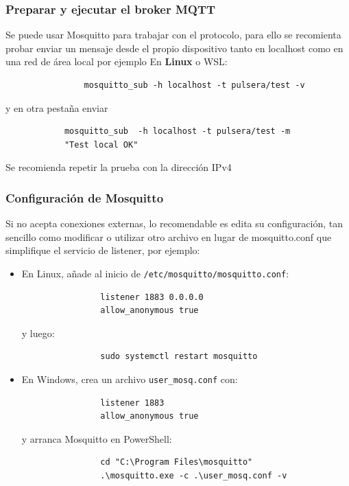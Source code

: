 \documentclass[12pt, a4paper]{article}
\begin{document}
\begin{umaappendices}
\begin{itemize}
	\end{itemize}
		
	\subsubsection{Preparar y ejecutar el broker MQTT}
		Se puede usar Mosquitto para trabajar con el protocolo, para ello se recomienta probar enviar un mensaje desde el propio dispositivo tanto en localhost como en una red de área local 
		por ejemplo  
		En \textbf{Linux} o WSL:

			\begin{verbatim}
				mosquitto_sub -h localhost -t pulsera/test -v
			\end{verbatim}
		y en otra pestaña enviar 
		
			\begin{verbatim}
			mosquitto_sub  -h localhost -t pulsera/test -m 
			"Test local OK"
			\end{verbatim}
			
		Se recomienda repetir la prueba con la dirección IPv4
		
		\subsubsection{Configuración de Mosquitto}
		Si no acepta conexiones externas, lo recomendable es edita su configuración, tan sencillo como modificar o utilizar otro archivo en lugar de mosquitto.conf que simplifique el servicio de listener, por ejemplo:
		
		\begin{itemize}
			\item En Linux, añade al inicio de \texttt{/etc/mosquitto/mosquitto.conf}:
			\begin{verbatim}
				listener 1883 0.0.0.0
				allow_anonymous true
			\end{verbatim}
			y luego:
			\begin{verbatim}
				sudo systemctl restart mosquitto
			\end{verbatim}
			\item En Windows, crea un archivo \texttt{user\_mosq.conf} con:
			\begin{verbatim}
				listener 1883
				allow_anonymous true
			\end{verbatim}
			y arranca Mosquitto en PowerShell:
			\begin{verbatim}
				cd "C:\Program Files\mosquitto"
				.\mosquitto.exe -c .\user_mosq.conf -v
			\end{verbatim}
		\end{itemize}
		

\end{umaappendices}
\end{document}
